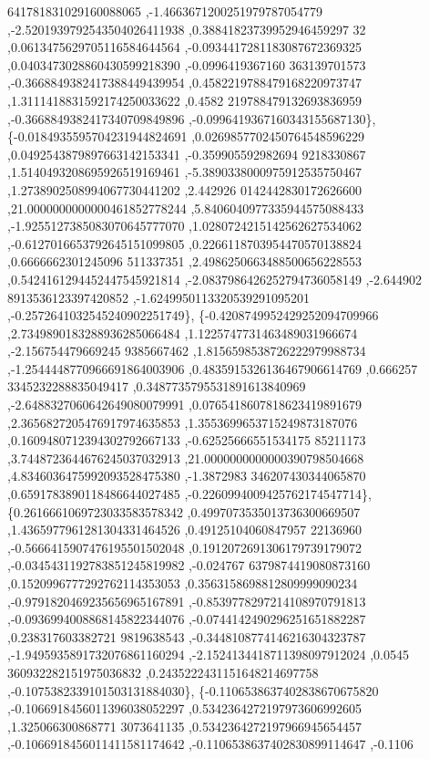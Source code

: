 \begin{DoxyCode}
      641781831029160088065 ,-1.4663671200251979787054779 ,-2.5201939792543504026411938 ,0.38841823739952946459297
      32 ,0.0613475629705116584644564 ,-0.0934417281183087672369325 ,0.0403473028860430599218390 ,-0.0996419367160
      363139701573 ,-0.3668849382417388449439954 ,0.4582219788479168220973747 ,1.3111418831592174250033622 ,0.4582
      219788479132693836959 ,-0.3668849382417340709849896 ,-0.0996419367160343155687130\},
\{-0.0184935595704231944824691 ,0.0269857702450764548596229 ,0.0492543879897663142153341 ,-0.359905592982694
      9218330867 ,1.5140493208695926519169461 ,-5.3890338000975912535750467 ,1.2738902508994067730441202 ,2.442926
      0142442830172626600 ,21.0000000000000461852778244 ,5.8406040977335944575088433 ,-1.9255127385083070645777070
       ,1.0280724215142562627534062 ,-0.6127016653792645151099805 ,0.2266118703954470570138824 ,0.6666662301245096
      511337351 ,2.4986250663488500656228553 ,0.5424161294452447545921814 ,-2.0837986426252794736058149 ,-2.644902
      8913536123397420852 ,-1.6249950113320539291095201 ,-0.2572641032545240902251749\},
\{-0.4208749952429252094709966 ,2.7349890183288936285066484 ,1.1225747731463489031966674 ,-2.156754479669245
      9385667462 ,1.8156598538726222979988734 ,-1.2544448770966691864003906 ,0.4835915326136467906614769 ,0.666257
      3345232288835049417 ,0.3487735795531891613840969 ,-2.6488327060642649080079991 ,0.0765418607818623419891679 
      ,2.3656827205476917974635853 ,1.3553699653715249873187076 ,0.1609480712394302792667133 ,-0.62525666551534175
      85211173 ,3.7448723644676245037032913 ,21.0000000000000390798504668 ,4.8346036475992093528475380 ,-1.3872983
      346207430344065870 ,0.6591783890118486644027485 ,-0.2260994009425762174547714\},
\{0.2616661069723033583578342 ,0.4997073535013736300669507 ,1.4365977961281304331464526 ,0.49125104060847957
      22136960 ,-0.5666415907476195501502048 ,0.1912072691306179739179072 ,-0.0345431192783851245819982 ,-0.024767
      6379874419080873160 ,0.1520996777292762114353053 ,0.3563158698812809999090234 ,-0.9791820469235656965167891 
      ,-0.8539778297214108970791813 ,-0.0936994008868145822344076 ,-0.0744142490296251651882287 ,0.238317603382721
      9819638543 ,-0.3448108774146216304323787 ,-1.9495935891732076861160294 ,-2.1524134418711398097912024 ,0.0545
      360932282151975036832 ,0.2435222431151648214697758 ,-0.1075382339101503131884030\},
\{-0.1106538637402838670675820 ,-0.1066918456011396038052297 ,0.5342364272197973606992605 ,1.325066300868771
      3073641135 ,0.5342364272197966945654457 ,-0.1066918456011411581174642 ,-0.1106538637402830899114647 ,-0.1106

\end{DoxyCode}
